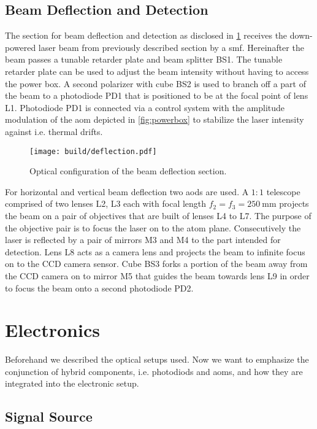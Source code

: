 \subsection{Beam Deflection and Detection}
\label{sec:deflection}

The section for beam deflection and detection as disclosed in
\cref{fig:deflection} receives the down-powered laser beam from previously
described section by a \gls{smf}. Hereinafter the beam passes a tunable
retarder plate and beam splitter BS1. The tunable retarder plate can be used
to adjust the beam intensity without having to access the power box.
A second polarizer with cube BS2 is used to branch off a part of the beam
to a photodiode PD1 that is positioned to be at the focal point of lens L1.
Photodiode PD1 is connected via a control system with the amplitude
modulation of the \gls{aom} depicted in \cref{fig:powerbox} to stabilize
the laser intensity against i.e. thermal drifts.

\begin{figure}[h]
  \centering
  \texttt{[image: build/deflection.pdf]}
  \caption{Optical configuration of the beam deflection section.}
  \label{fig:deflection}
\end{figure}

For horizontal and vertical beam deflection two \gls{aod}s are used. A $1:1$
telescope comprised of two lenses L2, L3
each with focal length $f_2=f_3=\SI{250}{\milli\meter}$ projects the beam
on a pair of objectives that are built of lenses L4 to L7. The purpose of the
objective pair is to focus the laser on to the atom plane.
Consecutively the laser is reflected by a pair of mirrors M3 and M4 to the
part intended for detection. Lens L8 acts as a camera lens and projects the
beam to infinite focus on to the CCD camera sensor. Cube BS3 forks a portion
of the beam away from the CCD camera on to mirror M5 that guides the beam
towards lens L9 in order to focus the beam onto a second photodiode PD2.

\section{Electronics}

Beforehand we described the optical setups used. Now we want to emphasize
the conjunction of hybrid components, i.e. photodiods and \gls{aom}s, and
how they are integrated into the electronic setup.

\subsection{Signal Source}

